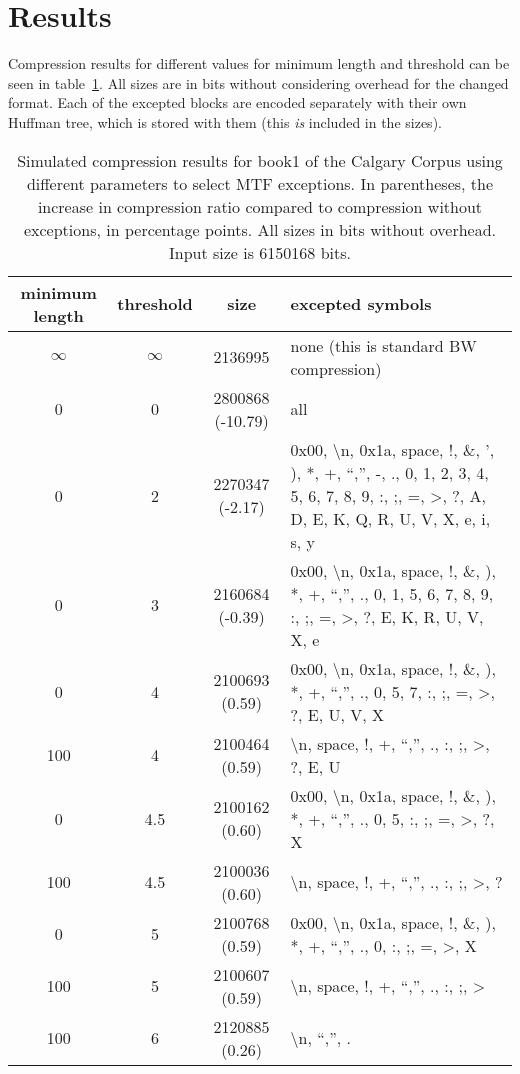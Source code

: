 \documentclass[a4paper]{scrreprt}
\begin{document}
\section{Results}

Compression results for different values for minimum length and threshold can be
seen in table~\ref{tab:resmtfexc}. All sizes are in bits without considering
overhead for the changed format. Each of the excepted blocks are encoded
separately with their own Huffman tree, which is stored with them (this
\emph{is} included in the sizes).

\begin{table}
\centering
\begin{tabularx}{\textwidth}{c|c|c|X}
minimum length & threshold & size & excepted symbols \\ \hline
\(\infty\) & \(\infty\) & 2136995 & none (this is standard BW compression) \\
0 & 0 & 2800868 (-10.79) & all \\
0 & 2 & 2270347 (-2.17) & 0x00, \textbackslash n, 0x1a, space, !, \&, ', ), *, +, ``,'',
-, ., 0, 1, 2, 3, 4, 5, 6, 7, 8, 9, :, ;, =, >, ?, A, D, E, K, Q, R, U, V, X, e,
i, s, y \\
0 & 3 & 2160684 (-0.39) & 0x00, \textbackslash n, 0x1a, space, !, \&, ), *, +,
``,'', ., 0, 1, 5, 6, 7, 8, 9, :, ;, =, >, ?, E, K, R, U, V, X, e \\
0 & 4 & 2100693 (0.59) & 0x00, \textbackslash n, 0x1a, space, !, \&, ), *, +, ``,'', .,
0, 5, 7, :, ;, =, >, ?, E, U, V, X \\
100 & 4 & 2100464 (0.59) & \textbackslash n, space, !, +, ``,'', ., :, ;, >, ?, E, U \\
0 & 4.5 & 2100162 (0.60) & 0x00, \textbackslash n, 0x1a, space, !, \&, ), *, +, ``,'',
., 0, 5, :, ;, =, >, ?, X \\
100 & 4.5 & 2100036 (0.60) & \textbackslash n, space, !, +, ``,'', ., :, ;, >, ? \\
0 & 5 & 2100768 (0.59) & 0x00, \textbackslash n, 0x1a, space, !, \&, ), *, +,
``,'', ., 0, :, ;, =, >, X \\
100 & 5 & 2100607 (0.59) & \textbackslash n, space, !, +, ``,'', ., :, ;, > \\
100 & 6 & 2120885 (0.26) & \textbackslash n, ``,'', . \\
\end{tabularx}
\caption{Simulated compression results for book1 of the Calgary Corpus using
different parameters to select MTF exceptions. In parentheses, the increase in
compression ratio compared to compression without exceptions, in percentage
points. All sizes in bits without overhead. Input size is 6150168 bits.}
\label{tab:resmtfexc}
\end{table}
\end{document}
